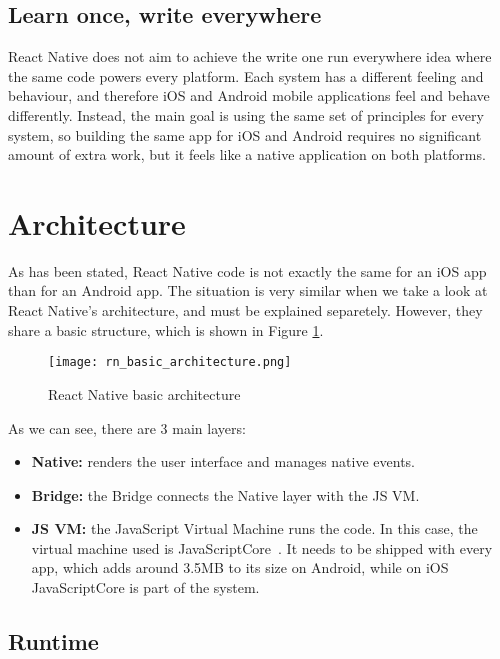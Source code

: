 \subsection{Learn once, write everywhere}

React Native does not aim to achieve the write one run everywhere idea where the same code powers every platform. Each system has a different feeling and behaviour, and therefore iOS and Android mobile applications feel and behave differently. Instead, the main goal is using the same set of principles for every system, so building the same app for iOS and Android requires no significant amount of extra work, but it feels like a native application on both platforms.

\section{Architecture}

As has been stated, React Native code is not exactly the same for an iOS app than for an Android app. The situation is very similar when we take a look at React Native's architecture, and must be explained separetely. However, they share a basic structure, which is shown in Figure \ref{fig:rnbasicarch}.

\begin{figure}[H]
	\centering
	\texttt{[image: rn\_basic\_architecture.png]}
	\caption{React Native basic architecture\label{fig:rnbasicarch}}
\end{figure}

As we can see, there are 3 main layers:

\begin{itemize}
 \item \textbf{Native:} renders the user interface and manages native events.
 \item \textbf{Bridge:} the Bridge connects the Native layer with the JS VM.
 \item \textbf{JS VM:} the JavaScript Virtual Machine runs the code. In this case, the virtual machine used is JavaScriptCore~\cite{javascriptcore}. It needs to be shipped with every app, which adds around 3.5MB to its size on Android, while on iOS JavaScriptCore is part of the system.
\end{itemize}

\subsection{Runtime}
\label{subsec:runtime}


